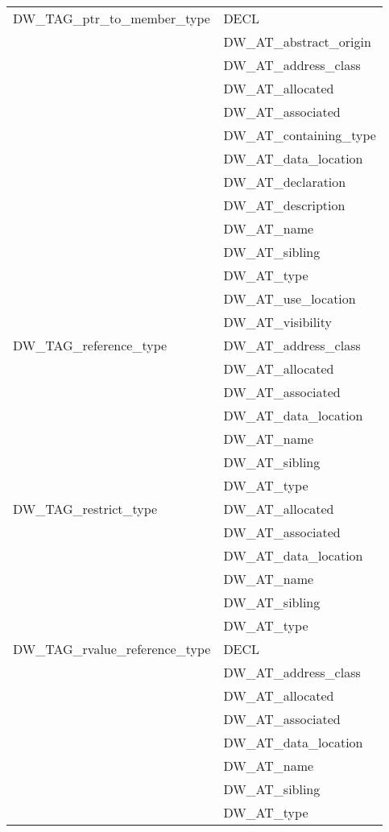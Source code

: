 \begin{longtable}{l|p{8cm}}
DW\_TAG\_ptr\_to\_member\_type
&DECL  \\
&DW\_AT\_abstract\_origin  \\
&DW\_AT\_address\_class  \\
&DW\_AT\_allocated  \\
&DW\_AT\_associated  \\
&DW\_AT\_containing\_type  \\
&DW\_AT\_data\_location  \\
&DW\_AT\_declaration  \\
&DW\_AT\_description  \\
&DW\_AT\_name  \\
&DW\_AT\_sibling  \\
&DW\_AT\_type  \\
&DW\_AT\_use\_location  \\
&DW\_AT\_visibility  \\


DW\_TAG\_reference\_type
&DW\_AT\_address\_class  \\
&DW\_AT\_allocated  \\
&DW\_AT\_associated  \\
&DW\_AT\_data\_location  \\
&DW\_AT\_name  \\
&DW\_AT\_sibling  \\
&DW\_AT\_type  \\

DW\_TAG\_restrict\_type
&DW\_AT\_allocated  \\
&DW\_AT\_associated  \\
&DW\_AT\_data\_location  \\
&DW\_AT\_name  \\
&DW\_AT\_sibling  \\
&DW\_AT\_type  \\

DW\_TAG\_rvalue\_reference\_type
&DECL  \\
&DW\_AT\_address\_class  \\
&DW\_AT\_allocated  \\
&DW\_AT\_associated  \\
&DW\_AT\_data\_location  \\
&DW\_AT\_name  \\
&DW\_AT\_sibling  \\
&DW\_AT\_type  \\



\end{longtable}
